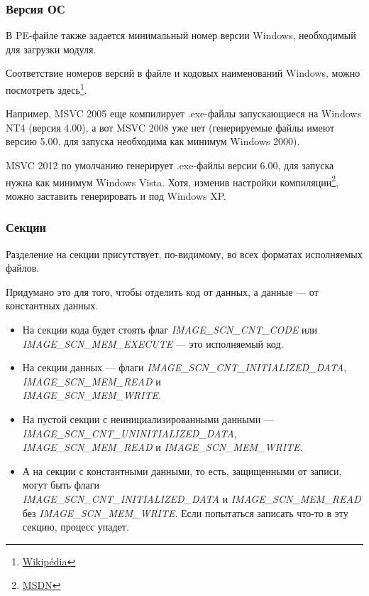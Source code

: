 \subsubsection{Версия ОС}

В PE-файле также задается минимальный номер версии Windows, необходимый для загрузки модуля.

Соответствие номеров версий в файле и кодовых наименований Windows, можно посмотреть
здесь\footnote{\href{http://go.yurichev.com/17044}{Wikipédia}}.

Например, \ac{MSVC} 2005 еще компилирует .exe-файлы запускающиеся на Windows NT4 (версия 4.00), а вот \ac{MSVC} 2008 уже нет 
(генерируемые файлы имеют версию 5.00, для запуска необходима как минимум Windows 2000).

\ac{MSVC} 2012 по умолчанию генерирует .exe-файлы версии 6.00, для запуска нужна как минимум Windows Vista. 
Хотя, изменив настройки компиляции\footnote{\href{http://go.yurichev.com/17045}{MSDN}},
можно заставить генерировать и под Windows XP.

\subsubsection{Секции}

Разделение на секции присутствует, по-видимому, во всех форматах исполняемых файлов.

Придумано это для того, чтобы отделить код от данных, а данные --- от константных данных.

\begin{itemize}
\item На секции кода будет стоять флаг \emph{IMAGE\_SCN\_CNT\_CODE} или \emph{IMAGE\_SCN\_MEM\_EXECUTE} --- это исполняемый код.

\item На секции данных --- флаги \emph{IMAGE\_SCN\_CNT\_INITIALIZED\_DATA}, \emph{IMAGE\_SCN\_MEM\_READ} и \\
\emph{IMAGE\_SCN\_MEM\_WRITE}.

\item На пустой секции с неинициализированными данными --- \emph{IMAGE\_SCN\_CNT\_UNINITIALIZED\_DATA}, \emph{IMAGE\_SCN\_MEM\_READ} и \emph{IMAGE\_SCN\_MEM\_WRITE}.

\item А на секции с константными данными, то есть, защищенными от записи, могут быть флаги \\
\emph{IMAGE\_SCN\_CNT\_INITIALIZED\_DATA} и \emph{IMAGE\_SCN\_MEM\_READ} без \emph{IMAGE\_SCN\_MEM\_WRITE}. 
Если попытаться записать что-то в эту секцию, процесс упадет.
\end{itemize}

